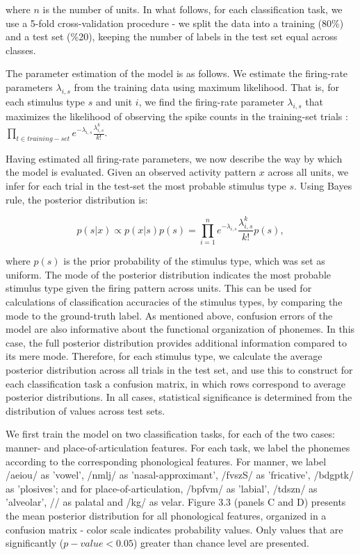 where $n$ is the number of units. In what follows, for each classification task, we use a 5-fold cross-validation procedure - we split the data into a training (80\%) and a test set (\%20), keeping the number of labels in the test set equal across classes.

The parameter estimation of the model is as follows. We estimate the firing-rate parameters $\lambda_{i,s}$ from the training data using maximum likelihood. That is, for each stimulus type $s$ and unit $i$, we find the firing-rate parameter $\lambda_{i,s}$ that maximizes the likelihood of observing the spike counts in the training-set trials :$\prod_{t \in training-set}{e^{-\lambda_{i,s}}\frac{\lambda_{i,s}^k}{k!}}$.
 
Having estimated all firing-rate parameters, we now describe the way by which the model is evaluated. Given an observed activity pattern $x$ across all units, we infer for each trial in the test-set the most probable stimulus type $s$. Using Bayes rule, the posterior distribution is: 

\begin{equation}
    p(s|x) \propto p(x|s)p(s) = \prod_{i=1}^n{e^{-\lambda_{i,s}}\frac{\lambda_{i,s}^k}{k!}p(s)}, 
\end{equation}

where $p(s)$ is the prior probability of the stimulus type, which was set as uniform. The mode of the posterior distribution indicates the most probable stimulus type given the firing pattern across units. This can be used for calculations of classification accuracies of the stimulus types, by comparing the mode to the ground-truth label. As mentioned above, confusion errors of the model are also informative about the functional organization of phonemes. In this case, the full posterior distribution provides additional information compared to its mere mode. Therefore, for each stimulus type, we calculate the average posterior distribution across all trials in the test set, and use this to construct for each classification task a confusion matrix, in which rows correspond to average posterior distributions. In all cases, statistical significance is determined from the distribution of values across test sets.

We first train the model on two classification tasks, for each of the two cases: manner- and place-of-articulation features. For each task, we label the phonemes according to the corresponding phonological features. For manner, we label /aeiou/ as 'vowel', /nmlj/ as 'nasal-approximant', /fvszS/ as 'fricative', /bdgptk/ as 'plosives'; and for place-of-articulation, /bpfvm/ as 'labial', /tdszn/ as 'alveolar', // as palatal and /kg/ as velar. Figure 3.3 (panels C and D) presents the mean posterior distribution for all phonological features, organized in a confusion matrix - color scale indicates probability values. Only values that are significantly ($p-value<0.05$) greater than chance level are presented. 

